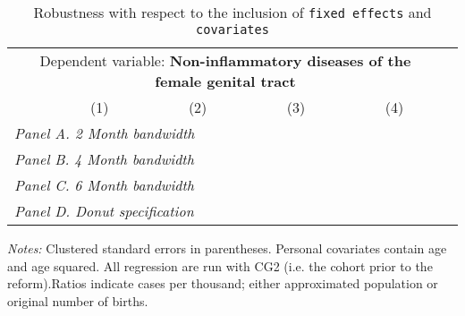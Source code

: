  \begin{table}[H] \begin{threeparttable} \centering \caption{Robustness with respect to the inclusion of \texttt{fixed effects} and \texttt{covariates}} {\def\sym#1{\ifmmode^{#1}\else\(^{#1}\)\fi} \begin{tabular}{l*{5}{c}} \toprule \multicolumn{5}{c}{Dependent variable: \textbf{Non-inflammatory diseases of the female genital tract}} \\ \cmidrule(lr){2-5}
            &\multicolumn{1}{c}{(1)}&\multicolumn{1}{c}{(2)}&\multicolumn{1}{c}{(3)}&\multicolumn{1}{c}{(4)}\\
\midrule
 \multicolumn{5}{l}{\emph{Panel A. 2 Month bandwidth}} \\    \midrule\multicolumn{5}{l}{\emph{Panel B. 4 Month bandwidth}} \\    \midrule\multicolumn{5}{l}{\emph{Panel C. 6 Month bandwidth}} \\    \midrule\multicolumn{5}{l}{\emph{Panel D. Donut specification}} \\    \midrule  
\bottomrule \end{tabular} } \begin{tablenotes} \item \scriptsize \emph{Notes:} Clustered standard errors in parentheses. Personal covariates contain age and age squared. All regression are run with CG2 (i.e. the cohort prior to the reform).Ratios indicate cases per thousand; either approximated population or original number of births. \end{tablenotes} \end{threeparttable} \end{table} 

